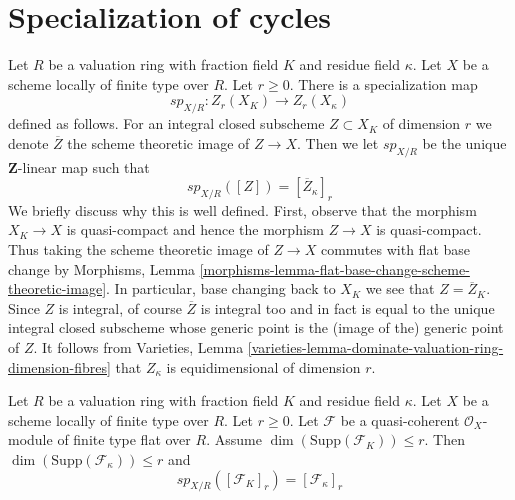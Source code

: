 \section{Specialization of cycles}
\label{section-specialization}

\noindent
Let $R$ be a valuation ring with fraction field $K$ and residue field $\kappa$.
Let $X$ be a scheme locally of finite type over $R$. Let $r \geq 0$.
There is a specialization map
$$
sp_{X/R} : Z_r(X_K) \longrightarrow Z_r(X_\kappa)
$$
defined as follows. For an integral closed subscheme $Z \subset X_K$
of dimension $r$ we denote $\overline{Z}$ the scheme theoretic image
of $Z \to X$. Then we let $sp_{X/R}$ be the unique $\mathbf{Z}$-linear
map such that
$$
sp_{X/R}([Z]) = [\overline{Z}_\kappa]_r
$$
We briefly discuss why this is well defined. First, observe that the
morphism $X_K \to X$ is quasi-compact and hence the morphism $Z \to X$
is quasi-compact. Thus taking the scheme theoretic image of $Z \to X$
commutes with flat base change by
Morphisms, Lemma \ref{morphisms-lemma-flat-base-change-scheme-theoretic-image}.
In particular, base changing back to $X_K$ we see that $Z = \overline{Z}_K$.
Since $Z$ is integral, of course $\overline{Z}$ is integral too and
in fact is equal to the unique integral closed subscheme whose generic
point is the (image of the) generic point of $Z$. It follows from
Varieties, Lemma \ref{varieties-lemma-dominate-valuation-ring-dimension-fibres}
that $Z_\kappa$ is equidimensional of dimension $r$.

\begin{lemma}
\label{lemma-specialization-module}
Let $R$ be a valuation ring with fraction field $K$ and residue field $\kappa$.
Let $X$ be a scheme locally of finite type over $R$. Let $r \geq 0$.
Let $\mathcal{F}$ be a quasi-coherent $\mathcal{O}_X$-module of finite type
flat over $R$. Assume $\dim(\text{Supp}(\mathcal{F}_K)) \leq r$.
Then $\dim(\text{Supp}(\mathcal{F}_\kappa)) \leq r$ and
$$
sp_{X/R}([\mathcal{F}_K]_r) = [\mathcal{F}_\kappa]_r
$$
\end{lemma}

